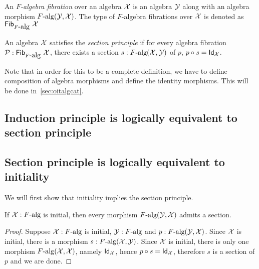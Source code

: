\documentclass[a4paper,10pt]{article}
\begin{document}
\begin{defn}
  An \emph{$F$-algebra fibration} over an algebra $\mathcal{X}$ is an
  algebra $\mathcal{Y}$ along with an algebra morphism
  $F\mbox{-alg}(\mathcal{Y},\mathcal{X})$. The type of $F$-algebra fibrations
  over $\mathcal{X}$ is denoted as $\mathsf{Fib}_{F\mbox{-alg}}\ \mathcal{X}$
\end{defn}

\begin{defn}
  An algebra $\mathcal{X}$ satisfies the \emph{section principle} if for
  every algebra fibration
  $\mathcal{P} : \mathsf{Fib}_{F\mbox{-alg}}\ \mathcal{X}$, there exists a section
  $s : F\mbox{-alg}(\mathcal{X},\mathcal{Y})$ of $p$, \ie
  $p \circ s = \mathsf{Id}_{\mathcal{X}}$.
\end{defn}

Note that in order for this to be a complete definition, we have to
define composition of algebra morphisms and define the identity
morphisms. This will be done in~\cref{sec:oitalgcat}.

\subsection{Induction principle is logically equivalent to section principle}
\label{sec:oitsectioninduction}


\subsection{Section principle is logically equivalent to initiality}
\label{sec:oitsectioninitiality}

We will first show that initiality implies the section principle.

\begin{prop}
  If $\mathcal{X} : F\mbox{-alg}$ is initial, then every morphism
  $F\mbox{-alg}(\mathcal{Y},\mathcal{X})$ admits a section.
\end{prop}

\begin{proof}
  Suppose $\mathcal{X} : F\mbox{-alg}$ is initial, $\mathcal{Y} : F\mbox{-alg}$
  and $p : F\mbox{-alg}(\mathcal{Y},\mathcal{X})$. Since $\mathcal{X}$ is initial,
  there is a morphism $s : F\mbox{-alg}(\mathcal{X},\mathcal{Y})$. Since
  $\mathcal{X}$ is initial, there is only one morphism
  $F\mbox{-alg}(\mathcal{X},\mathcal{X})$, namely $\mathsf{Id}_{\mathcal{X}}$, hence
  $p \circ s = \mathsf{Id}_{\mathcal{X}}$, therefore $s$ is a section of $p$ and we
  are done.
\end{proof}
\end{document}
